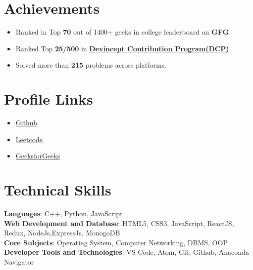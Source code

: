 \documentclass[letterpaper,11pt]{article}
\newcommand{\resumeItem}[1]{
  \item\small{
	{#1 \vspace{-2pt}}
  }
}
\newcommand{\resumeItemListStart}{\begin{itemize}}
\newcommand{\resumeItemListEnd}{\end{itemize}\vspace{-5pt}}
\begin{document}
%
\section{Achievements}
 \begin{itemize}[leftmargin=0, label={}]
	\resumeItemListStart
	
	   \resumeItem{Ranked in Top \textbf{70} out of 1400+ geeks in college leaderboard on \textbf{GFG}}
	
       \resumeItem{Ranked Top \textbf{25/500} in \textbf{{\href{https://dcp.devincept.com/}{Devincept Contribution Program(DCP)}}}.}
    	\resumeItem{Solved more than \textbf{215} problems across platforms.}
   \resumeItemListEnd
 \end{itemize}
 \vspace{-16pt}
 
\section{Profile Links}
 \begin{itemize}[leftmargin=0, label={}]
	\resumeItemListStart
    	\resumeItem 
    	{\href{https://github.com/Sourav61/}{Github}}
    	\resumeItem
        {\href{https://leetcode.com/whitedevil9/}{Leetcode}}
    	\resumeItem {\href{https://auth.geeksforgeeks.org/user/sourav61pahwa/practice}{GeeksforGeeks}}
  	\resumeItemListEnd
 \end{itemize}
 \vspace{-16pt}

%
\section{Technical Skills}
\vspace{4pt}
 \begin{itemize}[leftmargin=0.15in, label={}]
	\small{\item{
 	\textbf{Languages}{: C++, Python, JavaScript} \\
 	\textbf{Web Development and Database}{: HTML5, CSS3, JavaScript, ReactJS, Redux, NodeJs,ExpressJs, MonogoDB} \\
 	\textbf{Core Subjects}{: Operating System, Computer Networking, DBMS, OOP} \\
 	\textbf{Developer Tools and Technologies}{: VS Code, Atom, Git, Github, Anaconda Navigator} \\
	}}
 \end{itemize}
 \vspace{-16pt}
\end{document}
